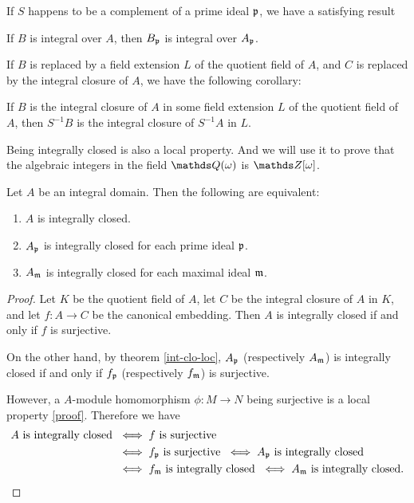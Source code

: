 			If $S$ happens to be a complement of a prime ideal $\mathfrak{p}$, we have a satisfying result
			
			\begin{corollary}\label{int-loc}
				If $B$ is integral over $A$, then $B_\mathfrak{p}$ is integral over $A_\mathfrak{p}$.
			\end{corollary}
			
			If $B$ is replaced by a field extension $L$ of the quotient field of $A$, and $C$ is replaced by the integral closure of $A$, we have the following corollary:
			
			\begin{corollary}
				If $B$ is the integral closure of $A$ in some field extension $L$ of the quotient field of $A$, then $S^{-1}B$ is the integral closure of $S^{-1}A$ in $L$.
			\end{corollary}
			
			Being integrally closed is also a local property. And we will use it to prove that the algebraic integers in the field $\Q(\omega)$ is $\Z[\omega]$.
			\begin{corollary}
				Let $A$ be an integral domain. Then the following are equivalent:
				\begin{enumerate}
					\item $A$ is integrally closed.
					\item $A_\mathfrak{p}$ is integrally closed for each prime ideal $\mathfrak{p}$. 
					\item $A_\mathfrak{m}$ is integrally closed for each maximal ideal $\mathfrak{m}$.
				\end{enumerate}
			\end{corollary}
		
			\begin{proof}
				Let $K$ be the quotient field of $A$, let $C$ be the integral closure of $A$ in $K$, and let $f:A \to C$ be the canonical embedding. Then $A$ is integrally closed if and only if $f$ is surjective.
				
				On the other hand, by theorem \ref{int-clo-loc}, $A_\mathfrak{p}$ (respectively $A_\mathfrak{m}$) is integrally closed if and only if $f_\mathfrak{p}$ (respectively $f_\mathfrak{m}$) is surjective.
				
				However, a $A$-module homomorphism $\phi:M \to N$ being surjective is a local property \href{https://www.maths.usyd.edu.au/u/de/AGR/CommutativeAlgebra/pp600-610.pdf}{[proof]}. Therefore we have
				\[
					\begin{aligned}
						A \text{ is integrally closed } &\iff f \text{ is surjective } \\
														&\iff f_\mathfrak{p} \text{ is surjective } \iff A_\mathfrak{p} \text{ is integrally closed } \\
														&\iff f_\mathfrak{m} \text{ is integrally closed } \iff A_\mathfrak{m} \text{ is integrally closed.}
					\end{aligned}
				\]
			\end{proof}
			

